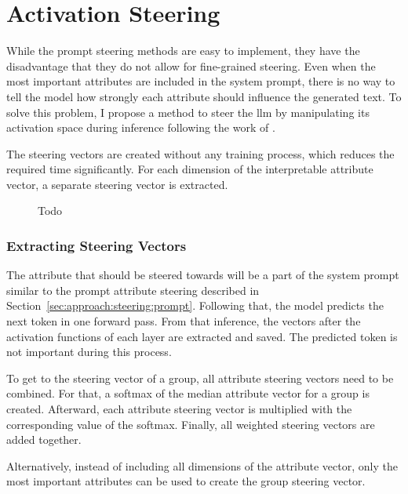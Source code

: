 \section{Activation Steering}

While the prompt steering methods are easy to implement, they have the disadvantage that they do not allow for fine-grained steering. Even when the most important attributes are included in the system prompt, there is no way to tell the model how strongly each attribute should influence the generated text. To solve this problem, I propose a method to steer the \ac{llm} by manipulating its activation space during inference following the work of \citet{turnerActivationAdditionSteering2024,rimsky-etal-2024-steering}.

The steering vectors are created without any training process, which reduces the required time significantly. For each dimension of the interpretable attribute vector, a separate steering vector is extracted.

\begin{figure}[ht]
  
  \label{fig:activationSteering}
  \caption{Todo}
\end{figure}

\subsubsection{Extracting Steering Vectors}
The attribute that should be steered towards will be a part of the system prompt similar to the prompt attribute steering described in Section~\ref{sec:approach:steering:prompt}. Following that, the model predicts the next token in one forward pass. From that inference, the vectors after the activation functions of each layer are extracted and saved. The predicted token is not important during this process. %

To get to the steering vector of a group, all attribute steering vectors need to be combined. For that, a softmax of the median attribute vector for a group is created. Afterward, each attribute steering vector is multiplied with the corresponding value of the softmax. Finally, all weighted steering vectors are added together.

Alternatively, instead of including all dimensions of the attribute vector, only the most important attributes can be used to create the group steering vector.

